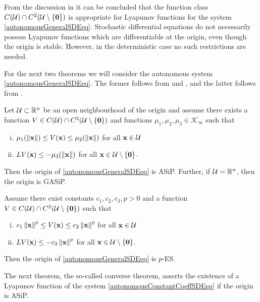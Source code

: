 \documentclass[a4paper,12pt,twoside,BCOR=10mm]{scrbook}
\begin{document}
From the discussion in \citep[p. 146]{sdestab2012khaminskii} it can be concluded that the function class $C(\mathcal{U})\cap C^2(\mathcal{U}\setminus \{\mathbf{0}\})$ is appropriate for Lyapunov functions for the system \eqref{autonomousGeneralSDEeq}. Stochastic differential equations do not necessarily possess Lyapunov functions which are differentiable at the origin, even though the origin is stable. However, in the deterministic case no such restrictions are needed.
 
For the next two theorems we will consider the autonomous system \eqref{autonomousGeneralSDEeq}. The former follows from \citep[Corollary 5.11]{sdestab2012khaminskii} and \citep[Theorem 5.8]{sdestab2012khaminskii}, and the latter follows from \citep[Theorem 5.11]{sdestab2012khaminskii}.

\begin{theorem}
Let $\mathcal{U} \subset \mathbb{R}^{n}$ be an open neighbourhood of the origin and assume there exists a function $V\in C(\mathcal{U})\cap C^2(\mathcal{U}\setminus \{\mathbf{0}\})$ and functions $\mu_1, \mu_2, \mu_3 \in \mathcal{K}_\infty$ such that
\begin{enumerate} [i)]
    \item $\mu_1(\left\lVert\mathbf{x}\right\rVert) \leq V(\mathbf{x}) \leq \mu_2(\left\lVert\mathbf{x}\right\rVert)$ for all $\mathbf{x} \in \mathcal{U}$
    \item $LV(\mathbf{x}) \leq -\mu_3(\left\lVert\mathbf{x}\right\rVert)$ for all $\mathbf{x}\in \mathcal{U}\setminus \{\mathbf{0}\}$.
\end{enumerate}
Then the origin of \eqref{autonomousGeneralSDEeq} is ASiP. Further, if $\mathcal{U} = \mathbb{R}^{n}$, then the origin is GASiP.
\end{theorem}

\begin{theorem}\label{ThmExistsConstantsThenPES}
Assume there exist constants $c_1, c_2, c_3, p > 0$ and a function $V\in C(\mathcal{U})\cap C^2(\mathcal{U}\setminus \{\mathbf{0}\})$ such that
\begin{enumerate}[i)]
    \item $c_1\left\lVert\mathbf{x}\right\rVert^p \leq V(\mathbf{x}) \leq c_2\left\lVert\mathbf{x}\right\rVert^p$ for all $\mathbf{x} \in \mathcal{U}$
    \item $LV(\mathbf{x}) \leq -c_3\left\lVert\mathbf{x}\right\rVert^p$ for all $\mathbf{x} \in \mathcal{U} \setminus \{\mathbf{0}\}$.
\end{enumerate}
Then the origin of \eqref{autonomousGeneralSDEeq} is $p$-ES.
\end{theorem}

The next theorem, the so-called converse theorem, asserts the existence of a Lyapunov function of the system \eqref{autonomousConstantCoeffSDEeq} if the origin is ASiP.
\end{document}

